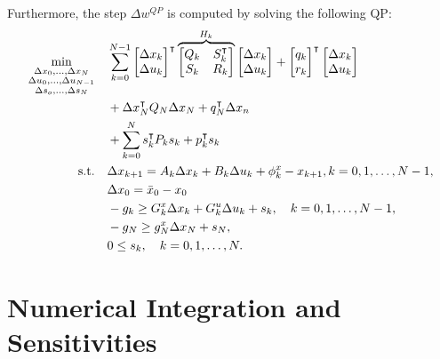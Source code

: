 \documentclass{thesisreport}
\begin{document}
Furthermore, the step $\Delta w^{QP}$ is computed by solving the following QP: 
    \begin{equation}\label{step_QP}
        \begin{aligned}
        \min_{\substack{\Delta x_0,\ldots,\Delta x_N\\ \Delta u_0,\ldots, \Delta u_{N-1} \\ \Delta s_o,\ldots, \Delta s_N }} \quad & \sum_{k=0}^{N-1}{  \begin{bmatrix} \Delta x_k \\ \Delta u_k \end{bmatrix}^{\intercal} \overbrace{\begin{bmatrix} Q_k & S_k^{\intercal} \\ S_k & R_k \end{bmatrix}}^{H_k} \begin{bmatrix} \Delta x_k \\ \Delta u_k \end{bmatrix} + \begin{bmatrix} q_k \\ r_k \end{bmatrix}^{\intercal} \begin{bmatrix} \Delta x_k \\ \Delta u_k \end{bmatrix}} \\ & + \Delta x_N^{\intercal} Q_N \Delta x_N + q_N^{\intercal} \Delta x_n \\ & + \sum_{k=0}^N s_k^{\intercal} P_k s_k + p_k^{\intercal} s_k \\
        \textrm{s.t.} \quad & \Delta x_{k+1} = A_k \Delta x_k + B_k \Delta u_k + \phi_k^x - x_{k+1},  k=0,1, \ldots, N-1,\\
            & \Delta x_0 = \bar{x}_0 - x_0 \\
            & -g_k \geq G_k^x \Delta x_k + G_k^u \Delta u_k + s_k, \text{\space \space \space} k=0,1, \ldots, N-1, \\
            & -g_N \geq g_N^x \Delta x_N + s_N, \\
            & 0 \leq s_k, \text{\space \space \space} k=0,1, \ldots, N.
        \end{aligned}
    \end{equation}


\section{Numerical Integration and Sensitivities}
\end{document}

